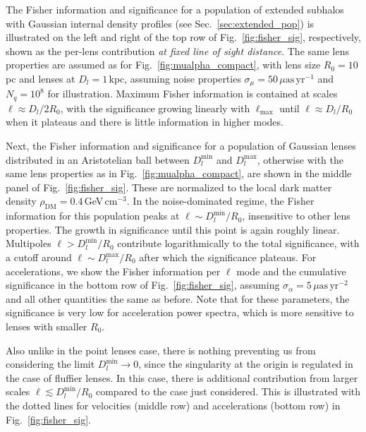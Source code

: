 \documentclass[prd,aps,twocolumn,nofootinbib,superscriptaddress,preprintnumbers,balancelastpage,longbibliography,floatfix]{revtex4-1}
\begin{document}
The Fisher information and significance for a population of extended subhalos with Gaussian internal density profiles (see Sec.~\ref{sec:extended_pop}) is illustrated on the left and right of the top row of Fig.~\ref{fig:fisher_sig}, respectively, shown as the per-lens contribution \emph{at fixed line of sight distance}. The same lens properties are assumed as for Fig.~\ref{fig:mualpha_compact}, with lens size $R_0=10$\,pc and lenses at $D_l=1$\,kpc, assuming noise properties $\sigma_\mu = 50\,\mu\mathrm{as}\,\mathrm{yr}^{-1}$ and $N_q = 10^8$ for illustration. Maximum Fisher information is contained at scales $\ell \approx {D_l}/{2R_0}$, with the significance growing linearly with $\ell_\mathrm{max}$ until $\ell \approx {D_l}/{R_0}$ when it plateaus and there is little information in higher modes. 

Next, the Fisher information and significance for a population of Gaussian lenses distributed in an Aristotelian ball between $D_l^{\mathrm{min}}$ and $D_l^{\mathrm{max}}$, otherwise with the same lens properties as in Fig.~\ref{fig:mualpha_compact}, are shown in the middle panel of Fig.~\ref{fig:fisher_sig}. These are normalized to the local dark matter density $\rho_\mathrm{DM}=0.4$\,GeV\,cm$^{-3}$.
In the noise-dominated regime, the Fisher information for this population peaks at $\ell \sim D_l^{\mathrm{min}}/R_0$, insensitive to other lens properties. The growth in significance until this point is again roughly linear. 
Multipoles $\ell > D_l^{\mathrm{min}}/R_0$ contribute logarithmically to the total significance, with a cutoff around $\ell \sim D_l^{\mathrm{max}}/R_0$ after which the significance plateaus. For accelerations, we show the Fisher information per $\ell$ mode and the cumulative significance in the bottom row of Fig.~\ref{fig:fisher_sig}, assuming $\sigma_\alpha = 5\,\mu\mathrm{as}\,\mathrm{yr}^{-2}$ and all other quantities the same as before. Note that for these parameters, the significance is very low for acceleration power spectra, which is more sensitive to lenses with smaller $R_0$.

Also unlike in the point lenses case, there is nothing preventing us from considering the limit $D_l^\mathrm{min}\rightarrow0$, since the singularity at the origin is regulated in the case of fluffier lenses. In this case, there is additional contribution from larger scales $\ell\lesssim D_l^\mathrm{min} / R_0$ compared to the case just considered. This is illustrated with the dotted lines for velocities (middle row) and accelerations (bottom row) in Fig.~\ref{fig:fisher_sig}.
\end{document}

